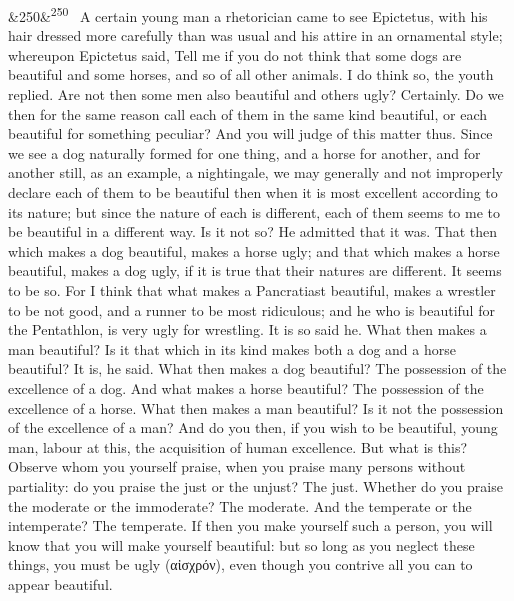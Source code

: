 \documentclass[12pt]{article}
\newcommand{\para}[1][]{\par\noindent\ifx&#1&\else\textsuperscript{\footnotesize #1}~\fi}
\begin{document}
\para[250] A certain young man a rhetorician came to see Epictetus, with his hair dressed more carefully than was usual and his attire in an ornamental style; whereupon Epictetus said, Tell me if you do not think that some dogs are beautiful and some horses, and so of all other animals. I do think so, the youth replied. Are not then some men also beautiful and others ugly? Certainly. Do we then for the same reason call each of them in the same kind beautiful, or each beautiful for something peculiar? And you will judge of this matter thus. Since we see a dog naturally formed for one thing, and a horse for another, and for another still, as an example, a nightingale, we may generally and not improperly declare each of them to be beautiful then when it is most excellent according to its nature; but since the nature of each is different, each of them seems to me to be beautiful in a different way. Is it not so? He admitted that it was. That then which makes a dog beautiful, makes a horse ugly; and that which makes a horse beautiful, makes a dog ugly, if it is true that their natures are different. It seems to be so. For I think that what makes a Pancratiast beautiful, makes a wrestler to be not good, and a runner to be most ridiculous; and he who is beautiful for the Pentathlon, is very ugly for wrestling. It is so said he. What then makes a man beautiful? Is it that which in its kind makes both a dog and a horse beautiful? It is, he said. What then makes a dog beautiful? The possession of the excellence of a dog. And what makes a horse beautiful? The possession of the excellence of a horse. What then makes a man beautiful? Is it not the possession of the excellence of a man? And do you then, if you wish to be beautiful, young man, labour at this, the acquisition of human excellence. But what is this? Observe whom you yourself praise, when you praise many persons without partiality: do you praise the just or the unjust? The just. Whether do you praise the moderate or the immoderate? The moderate. And the temperate or the intemperate? The temperate. If then you make yourself such a person, you will know that you will make yourself beautiful: but so long as you neglect these things, you must be ugly (αἰσχρόν), even though you contrive all you can to appear beautiful.
\end{document}
